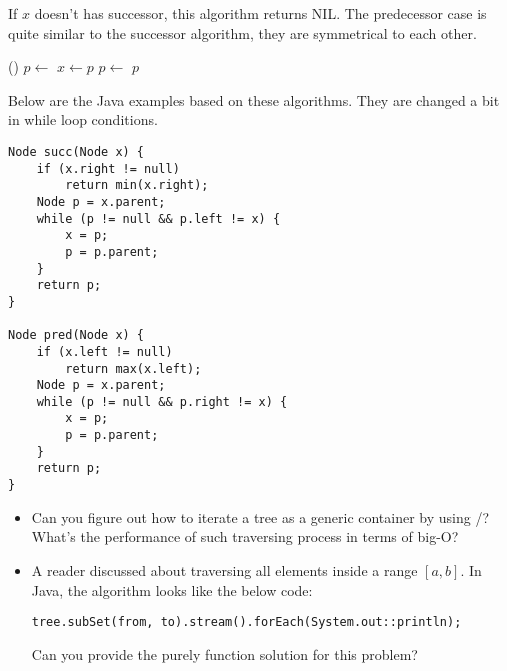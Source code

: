 \documentclass{article}
\begin{document}
If $x$ doesn't has successor, this algorithm returns NIL.
The predecessor case is quite similar to the successor algorithm, they
are symmetrical to each other.

\begin{algorithmic}[1]
    \State \Return {}()
  \Else
    \State $p \gets $ 
      \State $x \gets p$
      \State $p \gets $ 
    \EndWhile
    \State \Return $p$
  \EndIf
\EndFunction
\end{algorithmic}

Below are the Java examples based on these algorithms. They are changed
a bit in while loop conditions.

\lstset{language=Java}
\begin{lstlisting}
Node succ(Node x) {
    if (x.right != null)
        return min(x.right);
    Node p = x.parent;
    while (p != null && p.left != x) {
        x = p;
        p = p.parent;
    }
    return p;
}

Node pred(Node x) {
    if (x.left != null)
        return max(x.left);
    Node p = x.parent;
    while (p != null && p.right != x) {
        x = p;
        p = p.parent;
    }
    return p;
}
\end{lstlisting}

\begin{Exercise}

\begin{itemize}
\item Can you figure out how to iterate a tree as a generic container
by using /? What's the performance of such traversing
process in terms of big-O?

\item A reader discussed about traversing all elements inside a
range $[a, b]$. In Java, the algorithm looks like the below code:

\texttt{tree.subSet(from, to).stream().forEach(System.out::println);}

Can you provide the purely function solution for this problem?
\end{itemize}

\end{Exercise}

\end{document}
